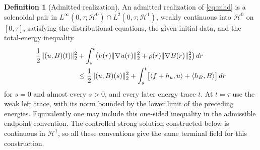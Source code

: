 \documentclass[11pt,a4paper]{amsart}
\theoremstyle{definition}
\newtheorem{definition}[theorem]{Definition}
\theoremstyle{remark}
\numberwithin{equation}{section}
\newcommand{\Hcal}{\mathcal H}
\newcommand{\ip}[2]{\langle #1,#2\rangle}
\newcommand{\norm}[1]{\lVert #1\rVert}
\begin{document}
\begin{definition}[Admitted realization]\label{def:weak}
An admitted realization of \eqref{eq:mhd} is a solenoidal pair in
$L^\infty(0,\tau;\Hcal^0)\cap L^2(0,\tau;\Hcal^1)$, weakly continuous into $\Hcal^0$ on $[0,\tau]$, satisfying the distributional equations, the given initial data, and the total-energy inequality
\begin{align}\label{eq:energy}
 \frac12\norm{(u,B)(t)}_2^2
 &+\int_s^t\bigl(\nu(r)\norm{\nabla u(r)}_2^2+
                 \rho(r)\norm{\nabla B(r)}_2^2\bigr)\,dr\notag\\
 &\le\frac12\norm{(u,B)(s)}_2^2+
 \int_s^t\bigl[\ip{f+h_u}{u}+\ip{h_B}{B}\bigr]\,dr
\end{align}
for $s=0$ and almost every $s>0$, and every later energy trace $t$. At $t=\tau$ use the weak left trace, with its norm bounded by the lower limit of the preceding energies. Equivalently one may include this one-sided inequality in the admissible endpoint convention. The controlled strong solution constructed below is continuous in $\Hcal^1$, so all these conventions give the same terminal field for this construction.
\end{definition}
\end{document}

